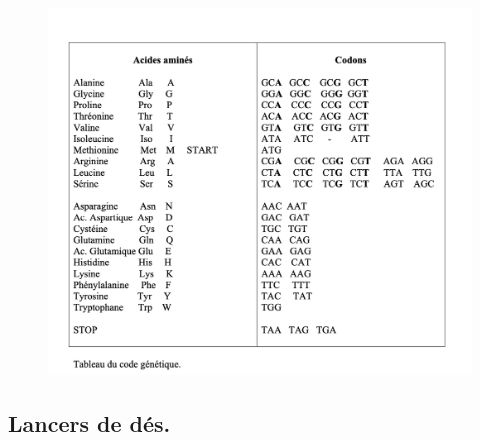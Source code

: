 


\begin{figure}[h]
\centering
\includegraphics[scale=0.6]{code}
\end{figure}


\begin{correction}

\end{correction}


\subsection{Lancers de dés. }



